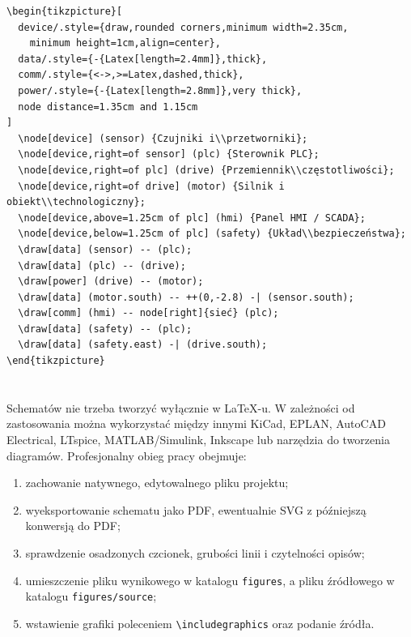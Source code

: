 \begin{lstlisting}[style=thesis,caption={Kod przykładowej architektury układu automatyki},label={lst:architektura-automatyki}]
\begin{tikzpicture}[
  device/.style={draw,rounded corners,minimum width=2.35cm,
    minimum height=1cm,align=center},
  data/.style={-{Latex[length=2.4mm]},thick},
  comm/.style={<->,>=Latex,dashed,thick},
  power/.style={-{Latex[length=2.8mm]},very thick},
  node distance=1.35cm and 1.15cm
]
  \node[device] (sensor) {Czujniki i\\przetworniki};
  \node[device,right=of sensor] (plc) {Sterownik PLC};
  \node[device,right=of plc] (drive) {Przemiennik\\częstotliwości};
  \node[device,right=of drive] (motor) {Silnik i obiekt\\technologiczny};
  \node[device,above=1.25cm of plc] (hmi) {Panel HMI / SCADA};
  \node[device,below=1.25cm of plc] (safety) {Układ\\bezpieczeństwa};
  \draw[data] (sensor) -- (plc);
  \draw[data] (plc) -- (drive);
  \draw[power] (drive) -- (motor);
  \draw[data] (motor.south) -- ++(0,-2.8) -| (sensor.south);
  \draw[comm] (hmi) -- node[right]{sieć} (plc);
  \draw[data] (safety) -- (plc);
  \draw[data] (safety.east) -| (drive.south);
\end{tikzpicture}
\end{lstlisting}

\section{}

Schematów nie trzeba tworzyć wyłącznie w LaTeX-u. W zależności od zastosowania można
wykorzystać między innymi KiCad, EPLAN, AutoCAD Electrical, LTspice, MATLAB/Simulink,
Inkscape lub narzędzia do tworzenia diagramów. Profesjonalny obieg pracy obejmuje:

\begin{enumerate}
  \item zachowanie natywnego, edytowalnego pliku projektu;
  \item wyeksportowanie schematu jako PDF, ewentualnie SVG z późniejszą konwersją do PDF;
  \item sprawdzenie osadzonych czcionek, grubości linii i czytelności opisów;
  \item umieszczenie pliku wynikowego w katalogu \texttt{figures}, a pliku źródłowego
        w katalogu \texttt{figures/source};
  \item wstawienie grafiki poleceniem \verb|\includegraphics| oraz podanie źródła.
\end{enumerate}

